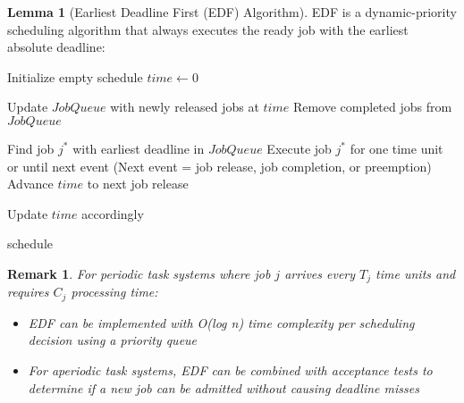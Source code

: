 \documentclass{article}
\newtheorem{remark}{Remark}
\theoremstyle{definition}
\newtheorem{lemma}{Lemma}
\begin{document}
\begin{lemma}[Earliest Deadline First (EDF) Algorithm]
EDF is a dynamic-priority scheduling algorithm that always executes the ready job with the earliest absolute deadline:

\begin{algorithm}
\caption{Earliest Deadline First (EDF)}
\begin{algorithmic}[1]
    \State Initialize empty schedule
    \State $time \gets 0$
    
        \State Update $JobQueue$ with newly released jobs at $time$
        \State Remove completed jobs from $JobQueue$
        
            \State Find job $j^*$ with earliest deadline in $JobQueue$
            \State Execute job $j^*$ for one time unit or until next event
            \State (Next event = job release, job completion, or preemption)
        \Else
            \State Advance $time$ to next job release
        \EndIf
        
        \State Update $time$ accordingly
    \EndWhile
    
    \State \Return schedule
\EndProcedure
\end{algorithmic}
\end{algorithm}

\begin{remark}
For periodic task systems where job $j$ arrives every $T_j$ time units and requires $C_j$ processing time:
\begin{itemize}
    \item EDF can be implemented with O(log n) time complexity per scheduling decision using a priority queue
    \item For aperiodic task systems, EDF can be combined with acceptance tests to determine if a new job can be admitted without causing deadline misses
\end{itemize}
\end{remark}
\end{lemma}
\end{document}
